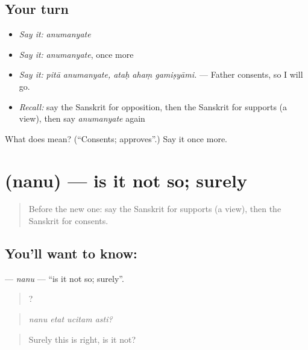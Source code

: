 \subsection*{Your turn}
\begin{itemize}
\raggedright
  \item \emph{Say it:} \emph{anumanyate}
  \item \emph{Say it:} \emph{anumanyate}, once more
  \item \emph{Say it:} \emph{pitā anumanyate, ataḥ ahaṃ gamiṣyāmi.} — Father consents, so I will go.
  \item \emph{Recall:} say the Sanskrit for opposition, then the Sanskrit for supports (a view), then say \emph{anumanyate} again
\end{itemize}

\begin{tcolorbox}[breakable,colback=teal!4,colframe=teal!35!black,title={Before you move on}]
What does  mean? (\textquotedblleft{}Consents; approves\textquotedblright{}.) Say it once more.
\end{tcolorbox}
\section[\texorpdfstring{\sk{ननु} (nanu)}{ननु (nanu)}]{ (nanu) — is it not so; surely}

\label{lesson:SA-C344-nanu}



\begin{quote}
Before the new one: say the Sanskrit for supports (a view), then the Sanskrit for consents.
\end{quote}

\subsection*{You'll want to know: }
\textbf{} — \emph{nanu} — \textquotedblleft{}is it not so; surely\textquotedblright{}.

\begin{quote}
   ?
\end{quote}

\begin{quote}
\emph{nanu etat ucitam asti?}
\end{quote}

\begin{quote}
Surely this is right, is it not?
\end{quote}

